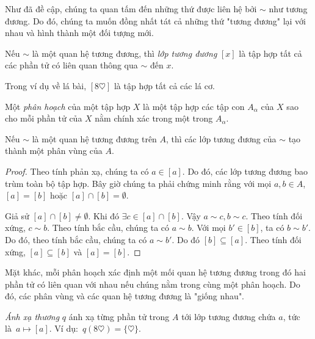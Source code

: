Như đã đề cập, chúng ta quan tấm đến những thứ được liên hệ bởi $\sim$ như tương đương. Do đó, chúng ta muốn đồng nhất tát cả những thứ "tương đương" lại với nhau và hình thành một đối tượng mới.
\begin{defi}
  Nếu $\sim$ là một quan hệ tương đương, thì \emph{lớp tương đương} $[x]$ là tập hợp tất cả các phần tử có liên quan thông qua $\sim$ đến $x$.
\end{defi}

\begin{eg}
  Trong ví dụ về lá bài, $[8\heartsuit]$ là tập hợp tất cả các lá cơ.
\end{eg}

\begin{defi}
  Một \emph{phân hoạch} của một tập hợp $X$ là một tập hợp các tập con $A_\alpha$ của $X$ sao cho mỗi phần tử của $X$ nằm chính xác trong một trong $A_\alpha$.
\end{defi}

\begin{thm}
  Nếu $\sim$ là một quan hệ tương đương trên $A$, thì các lớp tương đương của $\sim$ tạo thành một phân vùng của $A$.
\end{thm}

\begin{proof}


  Theo tính phản xạ, chúng ta có $a\in [a]$. Do đó, các lớp tương đương bao trùm toàn bộ tập hợp. Bây giờ chúng ta phải chứng minh rằng với mọi $a, b\in A$, $[a] = [b]$ hoặc $[a]\cap [b]=\emptyset$.

 Giả sử $[a]\cap[b]\not=\emptyset$. Khi đó $\exists c\in [a]\cap[b]$. Vậy $a\sim c, b\sim c$. Theo tính đối xứng, $c\sim b$. Theo tính bắc cầu, chúng ta có $a\sim b$. Với mọi $b'\in [b]$, ta có $b\sim b'$. Do đó, theo tính bắc cầu, chúng ta có $a\sim b'$. Do đó $[b]\subseteq[a]$. Theo tính đối xứng, $[a]\subseteq[b]$ và $[a] = [b]$.
\end{proof}


Mặt khác, mỗi phân hoạch xác định một mối quan hệ tương đương trong đó hai phần tử có liên quan với nhau nếu chúng nằm trong cùng một phân hoạch. Do đó, các phân vùng và các quan hệ tương đương là "giống nhau".
\begin{defi}
  \emph{Ánh xạ thương} $q$ ánh xạ từng phần tử trong $A$ tới lớp tương đương chứa $a$, tức là\ $a\mapsto [a]$. Ví dụ:\ $q(8\heartsuit) = \{\heartsuit\}$.
\end{defi}